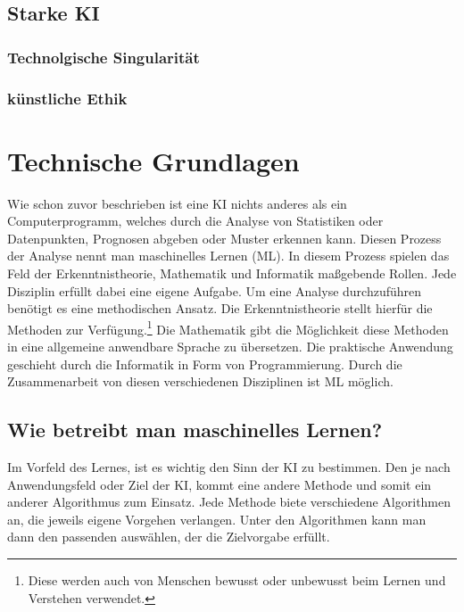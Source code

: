 \documentclass[12pt,german,ngerman]{report}
\begin{document}
        \subsection{}
    \section{Starke KI}
        \subsection{Technolgische Singularität}
        \subsection{künstliche Ethik}

\chapter{Technische Grundlagen}
     Wie schon zuvor beschrieben ist eine KI nichts anderes als ein Computerprogramm,
     welches durch die Analyse von Statistiken oder Datenpunkten, Prognosen abgeben oder Muster erkennen kann.
     Diesen Prozess der Analyse nennt man maschinelles Lernen (ML).
     In diesem Prozess spielen das Feld der Erkenntnistheorie, Mathematik und Informatik 
     maßgebende Rollen. Jede Disziplin erfüllt dabei eine eigene Aufgabe.
     Um eine Analyse durchzuführen benötigt es eine methodischen Ansatz.
     Die Erkenntnistheorie stellt hierfür die Methoden zur Verfügung.\footnote{Diese werden auch von 
     Menschen bewusst oder unbewusst beim Lernen und Verstehen verwendet.}
     Die Mathematik gibt die Möglichkeit diese Methoden in eine allgemeine anwendbare Sprache zu übersetzen.
     Die praktische Anwendung geschieht durch die Informatik in Form von Programmierung.
     Durch die Zusammenarbeit von diesen verschiedenen Disziplinen ist ML möglich.
        
    \section{Wie betreibt man maschinelles Lernen?}
        Im Vorfeld des Lernes, ist es wichtig den Sinn der KI zu bestimmen.
        Den je nach Anwendungsfeld oder Ziel der KI, kommt eine andere Methode und somit
        ein anderer Algorithmus zum Einsatz. Jede Methode biete verschiedene Algorithmen
        an, die jeweils eigene Vorgehen verlangen. Unter den Algorithmen kann man
        dann den passenden auswählen, der die Zielvorgabe erfüllt.
\end{document}
